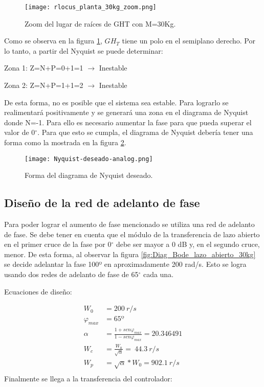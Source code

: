 \begin{figure}[H]
	\centering
	\texttt{[image: rlocus\_planta\_30kg\_zoom.png]}
	\caption{Zoom del lugar de raíces de GHT con M=30Kg.}
	\label{fig:rlocus_m30kg_zoom}
\end{figure}

\noindent Como se observa en la figura \ref{fig:rlocus_m30kg_zoom}, $GH_{T}$ tiene un polo en el semiplano derecho. Por lo tanto, a partir del Nyquist se puede determinar:

\noindent Zona 1: Z=N+P=0+1=1 $\mathrm{\to}$ Inestable 

\noindent Zona 2: Z=N+P=1+1=2 $\mathrm{\to}$ Inestable

\noindent De esta forma, no es posible que el sistema sea estable. Para lograrlo se realimentar\'{a} positivamente y se generar\'{a} una zona en el diagrama de Nyquist donde N=-1. Para ello es necesario aumentar la fase para que pueda superar el valor de 0$\mathrm{{}^\circ}$.  Para que esto se cumpla, el diagrama de Nyquist deber\'{i}a tener una forma como la  mostrada en la figura \ref{fig:nyquist-deseado-analog}.

\begin{figure}[H]
	\centering
	\texttt{[image: Nyquist-deseado-analog.png]}
	\caption{Forma del diagrama de Nyquist deseado.}
	\label{fig:nyquist-deseado-analog}
\end{figure}

\subsection{Diseño de la red de adelanto de fase}

\noindent Para poder lograr el aumento de fase mencionado se utiliza una red de adelanto de fase. Se debe tener en cuenta que el m\'{o}dulo de la transferencia de lazo abierto en el primer cruce de la fase por 0$\mathrm{{}^\circ}$ debe ser mayor a 0 dB y, en el segundo cruce, menor. De esta forma, al observar la figura \ref{fig:Diag_Bode_lazo_abierto_30kg} se decide adelantar la fase 100º en aproximadamente 200 rad/s. Esto se logra usando dos redes de adelanto de fase de 65$\mathrm{{}^\circ}$ cada una.

\noindent Ecuaciones de dise\~{n}o:

\begin{equation*}
	\begin{aligned}
		W_0 &=200\ r/s\\
		{\varphi }_{max} &=65\textrm{º}\\
		\alpha &=\frac{1+sen{\varphi }_{max}}{1-sen{\varphi }_{max}}=20.346491\\
		W_c &=\frac{W_0}{\sqrt{\alpha }}=\ 44.3\ r/s\\
		W_p &=\sqrt{\alpha }*W_0=902.1\ r/s\\
	\end{aligned}
\end{equation*} 
\noindent Finalmente se llega a la transferencia del controlador:

